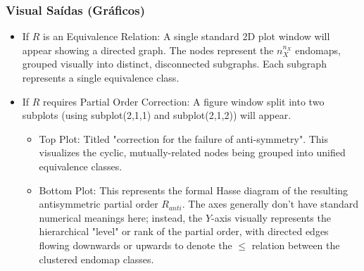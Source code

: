     \subsubsection*{Visual Saídas (Gráficos)}
        \begin{itemize}
            \item If $R$ is an Equivalence Relation: A single standard 2D plot window will appear showing a directed graph. The nodes represent the $n_X^{n_X}$ endomaps, grouped visually into distinct, disconnected subgraphs. Each subgraph represents a single equivalence class.
        \end{itemize}

     \begin{itemize}
             \item If $R$ requires Partial Order Correction: A figure window split into two subplots (using subplot(2,1,1) and subplot(2,1,2)) will appear.
             
             \begin{itemize}
\item Top Plot: Titled "correction for the failure of anti-symmetry". This visualizes the cyclic, mutually-related nodes being grouped into unified equivalence classes.
             \end{itemize}
             
             \begin{itemize}
\item Bottom Plot: This represents the formal Hasse diagram of the resulting antisymmetric partial order $R_{anti}$. The axes generally don't have standard numerical meanings here; instead, the $Y$-axis visually represents the hierarchical "level" or rank of the partial order, with directed edges flowing downwards or upwards to denote the $\leq$ relation between the clustered endomap classes.
             \end{itemize}
    \end{itemize}

